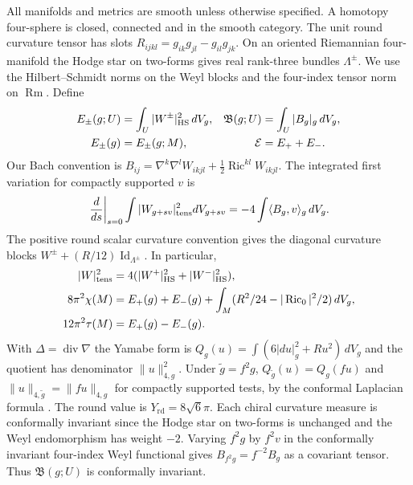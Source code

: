 \documentclass[11pt]{article}
\numberwithin{equation}{section}
\theoremstyle{definition}
\theoremstyle{remark}
\newcommand{\Ric}{\operatorname{Ric}}
\newcommand{\Rm}{\operatorname{Rm}}
\newcommand{\E}{\mathcal E}
\newcommand{\Bach}{\mathfrak B}
\newcommand{\Id}{\operatorname{Id}}
\newcommand{\Yrd}{Y_{\mathrm{rd}}}
\begin{document}
All manifolds and metrics are smooth unless otherwise specified. A
homotopy four-sphere is closed, connected and in the smooth category.
The unit round curvature tensor has slots
\(R_{ijkl}=g_{ik}g_{jl}-g_{il}g_{jk}\).
On an oriented Riemannian four-manifold the Hodge star on two-forms
gives real rank-three bundles \(\Lambda^\pm\). We use the
Hilbert--Schmidt norms on the Weyl blocks and the four-index tensor
norm on \(\Rm\). Define
\begin{align*}
 E_\pm(g;U)&=\int_U|W^\pm|_{\rm HS}^2\,dV_g,
 & \Bach(g;U)&=\int_U|B_g|_g\,dV_g,\\
 E_\pm(g)&=E_\pm(g;M),
 & \E&=E_++E_- .
\end{align*}
Our Bach convention is
\(B_{ij}=\nabla^k\nabla^l W_{ikjl}+\tfrac12\Ric^{kl}W_{ikjl}\).
The integrated first variation for compactly supported \(v\) is
\cite[\S1]{BahuaudGuentherIsenbergMazzeo2025Bach}
\[
 \left.\frac{d}{ds}\right|_{s=0}\int |W_{g+sv}|_{\rm tens}^2dV_{g+sv}
   =-4\int\langle B_g,v\rangle_g\,dV_g .
\]
The positive round scalar curvature convention gives the diagonal
curvature blocks \(W^\pm+(R/12)\Id_{\Lambda^\pm}\).
In particular,
\begin{align}
 |W|_{\rm tens}^2&=4(|W^+|_{\rm HS}^2+|W^-|_{\rm HS}^2),\\
 8\pi^2\chi(M)&=E_+(g)+E_-(g)+\int_M (R^2/24-|\Ric_0|^2/2)\,dV_g,\\
 12\pi^2\tau(M)&=E_+(g)-E_-(g).
 \label{eq:signature}
\end{align}
With \(\Delta=\operatorname{div}\nabla\) the Yamabe form is
\(Q_g(u)=\int(6|du|_g^2+Ru^2)\,dV_g\) and the quotient has
denominator \(\|u\|_{4,g}^2\). Under \(\widetilde g=f^2g\),
\(Q_{\widetilde g}(u)=Q_g(fu)\) and
\(\|u\|_{4,\widetilde g}=\|fu\|_{4,g}\) for compactly supported
tests, by the conformal Laplacian formula \cite[\S2]{LeeParker1987Yamabe}.
The round value is \(\Yrd=8\sqrt{6}\pi\). Each chiral curvature
measure is conformally invariant since the Hodge star on two-forms
is unchanged and the Weyl endomorphism has weight \(-2\).
Varying \(f^2g\) by \(f^2v\) in the conformally invariant
four-index Weyl functional gives \(B_{f^2g}=f^{-2}B_g\) as a
covariant tensor. Thus \(\Bach(g;U)\) is conformally invariant.
\end{document}
